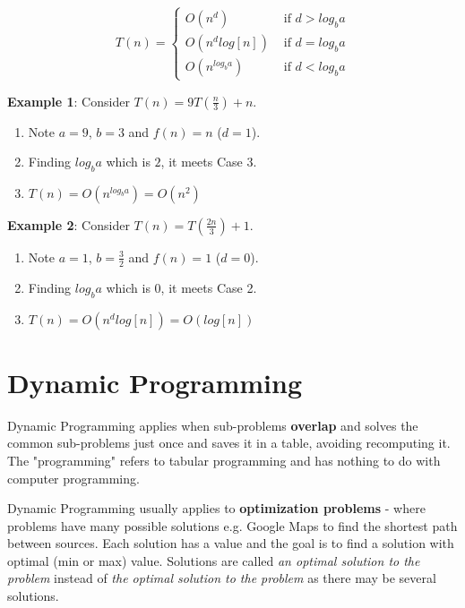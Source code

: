 \documentclass[10pt,a4paper]{article}
\begin{document}
\begin{equation*}
    T(n) = 
    \begin{cases}
        O(n^d) & \text{ if } d>log_b a \\
        O(n^dlog[n]) & \text{ if } d=log_ba \\
        O(n^{log_ba}) & \text{ if } d<log_ba
    \end{cases}
\end{equation*}

\textbf{Example 1}: Consider $T(n)=9T\left(\frac{n}{3}\right)+n$. \par 
\begin{enumerate}
    \item Note $a=9$, $b=3$ and $f(n)=n$ ($d=1$).
    \item Finding $log_ba$ which is $2$, it meets Case 3.
    \item $T(n)=O(n^{log_ba})=O(n^2)$
\end{enumerate}

\textbf{Example 2}: Consider $T(n)=T\left(\frac{2n}{3}\right)+1$. \par 
\begin{enumerate}
    \item Note $a=1$, $b=\frac{3}{2}$ and $f(n)=1$ ($d=0$).
    \item Finding $log_ba$ which is $0$, it meets Case 2.
    \item $T(n)=O(n^dlog[n])=O(log[n])$
\end{enumerate}

\pagebreak

\section{Dynamic Programming}

Dynamic Programming applies when sub-problems \textbf{overlap} and solves the common sub-problems
just once and saves it in a table, avoiding recomputing it. The "programming" refers to tabular
programming and has nothing to do with computer programming. \par 

Dynamic Programming usually applies to \textbf{optimization problems} - where problems have many
possible solutions e.g. Google Maps to ﬁnd the shortest
path between sources. Each solution has a value and the goal is to find a solution with optimal (min
or max) value. Solutions are called \textit{an optimal solution to the problem} instead of
\textit{the optimal solution to the problem} as there may be several solutions. \par 
\end{document}
